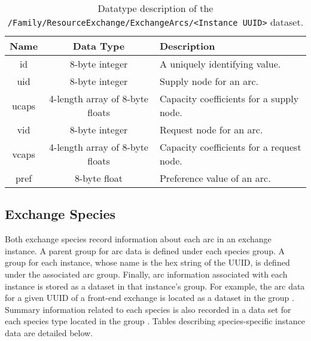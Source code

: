 \begin{table}[h!]
\centering
\caption{
\label{tbl:/Family/ResourceExchange/ExchangeArcs}
Datatype description of the \lstinline[basicstyle=\ttfamily\color{black}]|/Family/ResourceExchange/ExchangeArcs/<Instance UUID>| dataset.}
\begin{tabularx}{\columnwidth-10pt}{|c|c|X|} %
\hline
\textbf{Name} & \textbf{Data Type} & \textbf{Description}       \\ \hline
id & 8-byte integer & A uniquely identifying value. \\ \hline
uid & 8-byte integer & Supply node for an arc. \\ \hline
ucaps & 4-length array of 8-byte floats & Capacity coefficients for a supply node. \\ \hline
vid & 8-byte integer & Request node for an arc. \\ \hline
vcaps & 4-length array of 8-byte floats & Capacity coefficients for a request node. \\ \hline
pref & 8-byte float & Preference value of an arc. \\ \hline
\end{tabularx}
\end{table}

\subsection{Exchange Species}

Both exchange species record information about each arc in an exchange
instance. A parent group for arc data is defined under each species group. A
group for each instance, whose name is the hex string of the UUID, is defined
under the associated arc group. Finally, arc information associated with each
instance is stored as a dataset in that instance's group. For example, the arc
data for a given UUID of a front-end exchange is located as a dataset in the
group . Summary information
related to each species is also recorded in a data set for each species type
located in the group . Tables describing
species-specific instance data are detailed below.

